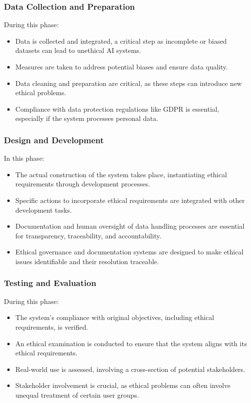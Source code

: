 \documentclass{article}
\begin{document}
\subsubsection{Data Collection and Preparation}
During this phase:
\begin{itemize}
    \item Data is collected and integrated, a critical step as incomplete or biased datasets can lead to unethical AI systems.
    \item Measures are taken to address potential biases and ensure data quality.
    \item Data cleaning and preparation are critical, as these steps can introduce new ethical problems.
    \item Compliance with data protection regulations like GDPR is essential, especially if the system processes personal data.
\end{itemize}

\subsubsection{Design and Development}
In this phase:
\begin{itemize}
    \item The actual construction of the system takes place, instantiating ethical requirements through development processes.
    \item Specific actions to incorporate ethical requirements are integrated with other development tasks.
    \item Documentation and human oversight of data handling processes are essential for transparency, traceability, and accountability.
    \item Ethical governance and documentation systems are designed to make ethical issues identifiable and their resolution traceable.
\end{itemize}

\subsubsection{Testing and Evaluation}
During this phase:
\begin{itemize}
    \item The system's compliance with original objectives, including ethical requirements, is verified.
    \item An ethical examination is conducted to ensure that the system aligns with its ethical requirements.
    \item Real-world use is assessed, involving a cross-section of potential stakeholders.
    \item Stakeholder involvement is crucial, as ethical problems can often involve unequal treatment of certain user groups.
\end{itemize}
\end{document}
